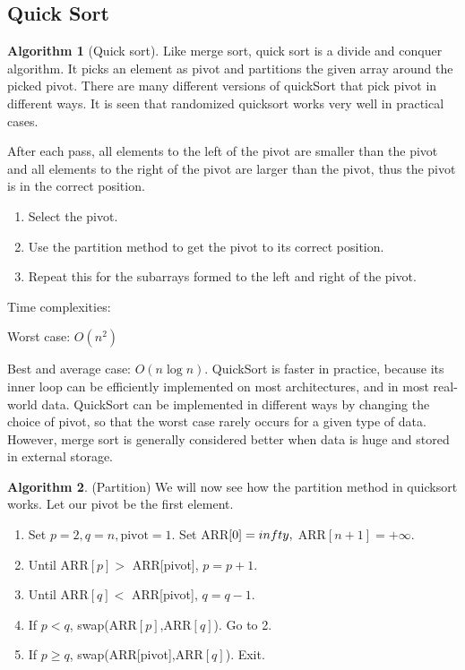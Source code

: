 \documentclass[10pt, a4paper]{extarticle}
\theoremstyle{definition}
\newtheorem{alg}{Algorithm}
\begin{document}
\subsection{Quick Sort}
\begin{alg}[Quick sort]
	Like merge sort, quick sort is a divide and conquer algorithm. It picks an element as pivot and partitions the given array around the picked pivot. There are many different versions of quickSort that pick pivot in different ways. It is seen that randomized quicksort works very well in practical cases.

	After each pass, all elements to the left of the pivot are smaller than the pivot and all elements to the right of the pivot are larger than the pivot, thus the pivot is in the correct position.
	\begin{enumerate}
		\item Select the pivot.
		\item Use the partition method to get the pivot to its correct position.
		\item Repeat this for the subarrays formed to the left and right of the pivot.
	\end{enumerate}
	Time complexities:

	Worst case: $O(n^2)$

	Best and average case: $O(n\log n)$. QuickSort is faster in practice, because its inner loop can be efficiently implemented on most architectures, and in most real-world data. QuickSort can be implemented in different ways by changing the choice of pivot, so that the worst case rarely occurs for a given type of data. However, merge sort is generally considered better when data is huge and stored in external storage.
\end{alg}

\begin{alg}(Partition)
	We will now see how the partition method in quicksort works. Let our pivot be the first element.
	\begin{enumerate}
		\item Set $p=2,q=n, \text{pivot}=1$. Set ARR$[0]=\-infty,$ ARR$[n+1]=+\infty$.
		\item Until ARR$[p]>$ ARR[pivot], $p=p+1$.
		\item Until ARR$[q]<$ ARR[pivot], $q=q-1$.
		\item If $p<q$, swap(ARR$[p]$,ARR$[q]$). Go to 2.
		\item If $p\geq q$, swap(ARR[pivot],ARR$[q]$). Exit.
	\end{enumerate}
\end{alg}
\end{document}
